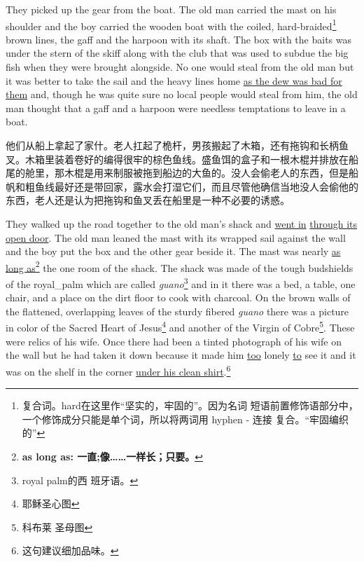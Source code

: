 \begin{paracol}{2}
\switchcolumn*

They picked up the \gls{gear} from the boat. The old man carried the mast on
his \gls{shoulder} and the boy carried the wooden boat with the coiled,
hard-\gls{braided}\footnote{复合词。hard在这里作“坚实的，牢固的”。因为名词
  短语前置修饰语部分中，一个修饰成分只能是单个词，所以将两词用 hyphen - 连接
  复合。“牢固编织的”} brown lines, the gaff and the harpoon with its
\gls{shaft}. The box with the baits was under the \gls{stern} of the
skiff along with the club that was used to \gls{subdue} the big fish
when they were brought \gls{alongside}. No one would \gls{steal} from the
old man but it was better to take the sail and the heavy lines home \uline{as
the \gls{dew} was bad for them} and, though he was quite sure no local people
would steal from him, the old man thought that a gaff and a harpoon were
\gls{needless} \glspl{temptation} to leave in a boat.

\switchcolumn

他们从船上拿起了家什。老人扛起了桅杆，男孩搬起了木箱，还有拖钩和长柄鱼叉。木箱里装着卷好的编得很牢的棕色鱼线。盛鱼饵的盒子和一根木棍并排放在船尾的舱里，那木棍是用来制服被拖到船边的大鱼的。没人会偷老人的东西，但是船帆和粗鱼线最好还是带回家，露水会打湿它们，而且尽管他确信当地没人会偷他的东西，老人还是认为把拖钩和鱼叉丢在船里是一种不必要的诱惑。

\switchcolumn*

They walked up the road together to the old man's \gls{shack} and
\uline{went in} \uline{through its open door}. The old man \gls{leaned} the
mast with its \gls{wrapped} sail \gls{against} the wall and the boy put the
box and the other gear beside it. The mast was \gls{nearly} \uline{as long
  as}\footnote{\textbf{as long as: 一直;像……一样长；只要。}} the one
room of the shack. The shack was made of the \gls{tough} \glspl{budshield}
of the \gls{royal_palm} which are called \emph{guano}\footnote{royal palm的西
  班牙语。} and in it there was a bed, a table, one chair, and a place on
the dirt floor to cook with \gls{charcoal}. On the brown walls of the
\gls{flattened}, \gls{overlapping} leaves of the \gls{sturdy} \gls{fibered}
\emph{guano} there was a \gls{picture} in color of the Sacred Heart of
Jesus\footnote{耶稣圣心图} and another of the Virgin of Cobre\footnote{科布莱
  圣母图}. These were \glspl{relic} of his wife. Once there had been a
\gls{tinted} photograph of his wife on the wall but he had taken it down
because it made him \uline{too} lonely \uline{to} see it and it was on the
shelf in the corner \uline{under his clean shirt}.\footnote{这句建议细加品味。}


\end{paracol}
